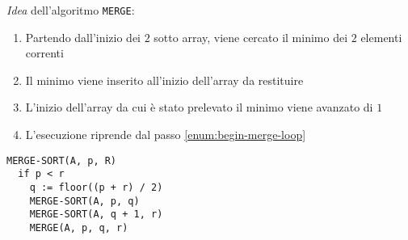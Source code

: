 \documentclass[italian, 10pt]{article}
\begin{document}
\textit{Idea} dell'algoritmo \texttt{MERGE}:

\begin{enumerate}
  \item \label{enum:begin-merge-loop} Partendo dall'inizio dei \(2\) sotto array, viene cercato il minimo dei \(2\) elementi correnti
  \item Il minimo viene inserito all'inizio dell'array da restituire
  \item L'inizio dell'array da cui è stato prelevato il minimo viene avanzato di \(1\)
  \item L'esecuzione riprende dal passo \ref{enum:begin-merge-loop}
\end{enumerate}

\begin{lstlisting}[style=pseudocode, caption={Pseudocodice dell'algoritmo \texttt{MERGE-SORT}}, label={lst:pseudocodice-merge-sort}]
MERGE-SORT(A, p, R)
  if p < r
    q := floor((p + r) / 2)
    MERGE-SORT(A, p, q)
    MERGE-SORT(A, q + 1, r)
    MERGE(A, p, q, r)
\end{lstlisting}
\end{document}
